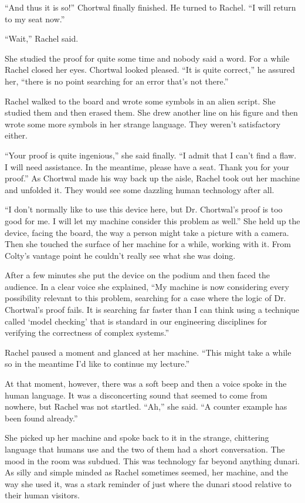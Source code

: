 ``And thus it is so!'' Chortwal finally finished. He turned to Rachel. ``I will return to my
seat now.''

``Wait,'' Rachel said.

She studied the proof for quite some time and nobody said a word. For a while Rachel closed her
eyes. Chortwal looked pleased. ``It is quite correct,'' he assured her, ``there is no point
searching for an error that's not there.''

Rachel walked to the board and wrote some symbols in an alien script. She studied them and then
erased them. She drew another line on his figure and then wrote some more symbols in her strange
language. They weren't satisfactory either.

``Your proof is quite ingenious,'' she said finally. ``I admit that I can't find a flaw. I will
need assistance. In the meantime, please have a seat. Thank you for your proof.'' As Chortwal
made his way back up the aisle, Rachel took out her machine and unfolded it. They would see some
dazzling human technology after all.

``I don't normally like to use this device here, but Dr. Chortwal's proof is too good for me. I
will let my machine consider this problem as well.'' She held up the device, facing the board,
the way a person might take a picture with a camera. Then she touched the surface of her machine
for a while, working with it. From Colty's vantage point he couldn't really see what she was
doing.

After a few minutes she put the device on the podium and then faced the audience. In a clear
voice she explained, ``My machine is now considering every possibility relevant to this problem,
searching for a case where the logic of Dr. Chortwal's proof fails. It is searching far faster
than I can think using a technique called `model checking' that is standard in our engineering
disciplines for verifying the correctness of complex systems.''

Rachel paused a moment and glanced at her machine. ``This might take a while so in the meantime
I'd like to continue my lecture.''

At that moment, however, there was a soft beep and then a voice spoke in the human language. It
was a disconcerting sound that seemed to come from nowhere, but Rachel was not startled. ``Ah,''
she said. ``A counter example has been found already.''

She picked up her machine and spoke back to it in the strange, chittering language that humans
use and the two of them had a short conversation. The mood in the room was subdued. This was
technology far beyond anything dunari. As silly and simple minded as Rachel sometimes seemed,
her machine, and the way she used it, was a stark reminder of just where the dunari stood
relative to their human visitors.

